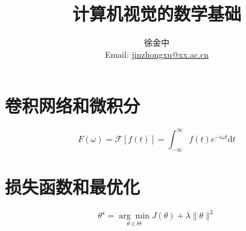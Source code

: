\documentclass{article}
\title{计算机视觉的数学基础}
\author{徐金中 \\ Email: \href{mailto:jinzhongxu@xx.ac.cn}{jinzhongxu@xx.ac.cn}}
\begin{document}
\maketitle





\section{卷积网络和微积分}







\begin{equation}\label{fft}
	F(\omega) = \mathcal{F}[f(t)] = \int_{-\infty}^{\infty} f(t)e^{-i\omega t} \mathrm{d}t
\end{equation}

\section{损失函数和最优化}

\begin{equation*}
	\theta^{\star} = \underset{\theta \in \Theta}{\arg \min} J(\theta) + \lambda \|\theta\|^2
\end{equation*} 
\end{document}
